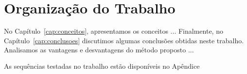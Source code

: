 \section{Organização do Trabalho}
\label{sec:organizacao_trabalho}

No Capítulo~\ref{cap:conceitos}, apresentamos os conceitos ... Finalmente, no
Capítulo~\ref{cap:conclusoes} discutimos algumas conclusões obtidas neste
trabalho. Analisamos as vantagens e desvantagens do método proposto ...

As sequências testadas no trabalho estão disponíveis no Apêndice
